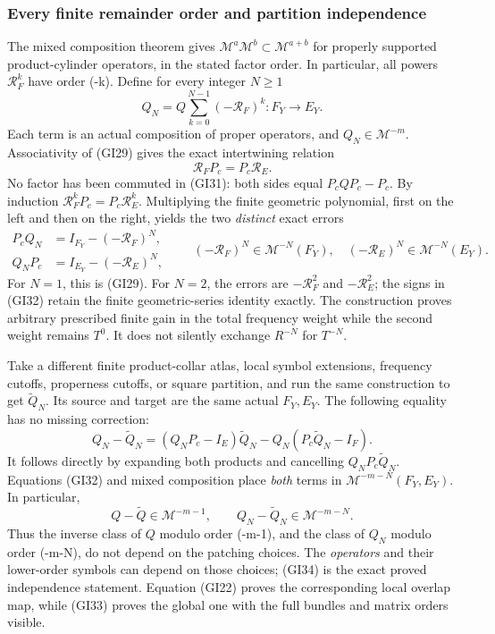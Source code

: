 \documentclass[
  11pt,
]{article}
\begin{document}
\subsubsection{Every finite remainder order and partition
independence}\label{every-finite-remainder-order-and-partition-independence}

The mixed composition theorem gives
\(\mathscr M^{a}\mathscr M^{b}\subset\mathscr M^{a+b}\) for properly
supported product-cylinder operators, in the stated factor order. In
particular, all powers \(\mathcal R_F^k\) have order (-k). Define for
every integer \(N\geq1\) \[
 Q_N=Q\sum_{k=0}^{N-1}(-\mathcal R_F)^k:F_Y\to E_Y.
 \tag{GI30}
\] Each term is an actual composition of proper operators, and
\(Q_N\in\mathscr M^{-m}\). Associativity of (GI29) gives the exact
intertwining relation \[
 \mathcal R_FP_c=P_c\mathcal R_E.
 \tag{GI31}
\] No factor has been commuted in (GI31): both sides equal
\(P_cQP_c-P_c\). By induction \(\mathcal R_F^kP_c=P_c\mathcal R_E^k\).
Multiplying the finite geometric polynomial, first on the left and then
on the right, yields the two \emph{distinct} exact errors \[
 \begin{aligned}
 P_cQ_N&=I_{F_Y}-(-\mathcal R_F)^N,\\
 Q_NP_c&=I_{E_Y}-(-\mathcal R_E)^N,
 \end{aligned}
 \qquad
 (-\mathcal R_F)^N\in\mathscr M^{-N}(F_Y),\quad
 (-\mathcal R_E)^N\in\mathscr M^{-N}(E_Y).
 \tag{GI32}
\] For \(N=1\), this is (GI29). For \(N=2\), the errors are
\(-\mathcal R_F^2\) and \(-\mathcal R_E^2\); the signs in (GI32) retain
the finite geometric-series identity exactly. The construction proves
arbitrary prescribed finite gain in the total frequency weight while the
second weight remains \(T^0\). It does not silently exchange \(R^{-N}\)
for \(T^{-N}\).

Take a different finite product-collar atlas, local symbol extensions,
frequency cutoffs, properness cutoffs, or square partition, and run the
same construction to get \(\widetilde Q_N\). Its source and target are
the same actual \(F_Y,E_Y\). The following equality has no missing
correction: \[
 Q_N-\widetilde Q_N
 =(Q_NP_c-I_E)\widetilde Q_N
  -Q_N(P_c\widetilde Q_N-I_F).
 \tag{GI33}
\] It follows directly by expanding both products and cancelling
\(Q_NP_c\widetilde Q_N\). Equations (GI32) and mixed composition place
\emph{both} terms in \(\mathscr M^{-m-N}(F_Y,E_Y)\). In particular, \[
 Q-\widetilde Q\in\mathscr M^{-m-1},
 \qquad Q_N-\widetilde Q_N\in\mathscr M^{-m-N}.
 \tag{GI34}
\] Thus the inverse class of \(Q\) modulo order (-m-1), and the class of
\(Q_N\) modulo order (-m-N), do not depend on the patching choices. The
\emph{operators} and their lower-order symbols can depend on those
choices; (GI34) is the exact proved independence statement. Equation
(GI22) proves the corresponding local overlap map, while (GI33) proves
the global one with the full bundles and matrix orders visible.
\end{document}
